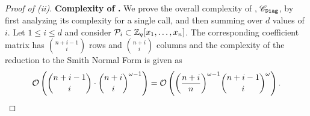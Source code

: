 
\begin{proof}[Proof of  (ii)]
\textbf{Complexity of \algdiag.}
We prove the overall complexity of \algdiag, $\mathscr{C}_{\texttt{Diag}}$, by first analyzing its complexity for a single call, and then summing over $d$ values of $i$.
Let $1\le i \le d$ and consider $\mathcal{P}_{i}\subset \mathbb{Z}_q[x_1,\dots,x_n]$.
The corresponding coefficient matrix has $\binom{n+i-1}{i}$ rows and $\binom{n+i}{i}$ columns and the complexity of the reduction to the Smith Normal Form is given as~\cite{DBLP:conf/issac/Storjohann96} \[\mathcal{O}\left(\binom{n+i-1}{i} \cdot \binom{n+i}{i}^{\omega-1}\right) = \mathcal{O}\left( {\left(\frac{n+i}{n}\right)}^{\omega-1}\binom{n+i-1}{i}^\omega \right).\] 



\end{proof}
